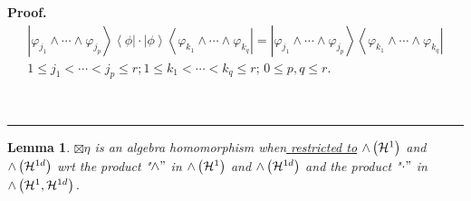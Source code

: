 \documentclass[aps,preprint]{revtex4}%
\newtheorem{lemma}[theorem]{Lemma}
\newenvironment{proof}[1][Proof]{\noindent\textbf{#1.} }{\ \rule{0.5em}{0.5em}}
\begin{document}
\begin{proof}%
\begin{gather}
\left\vert \varphi_{j_{1}}\wedge\cdots\wedge\varphi_{j_{p}}\right\rangle
\left\langle \phi\right\vert \cdot\left\vert \phi\right\rangle \left\langle
\varphi_{k_{1}}\wedge\cdots\wedge\varphi_{k_{q}}\right\vert =\left\vert
\varphi_{j_{1}}\wedge\cdots\wedge\varphi_{j_{p}}\right\rangle \left\langle
\varphi_{k_{1}}\wedge\cdots\wedge\varphi_{k_{q}}\right\vert \\
1\leq j_{1}<\cdots<j_{p}\leq r;1\leq k_{1}<\cdots<k_{q}\leq r;\,0\leq p,q\leq
r.
\end{gather}

\end{proof}

\begin{lemma}
$\boxtimes\eta$ is an algebra homomorphism \emph{when}\underline{\emph{
restricted to}} ${\huge \wedge}\left(  \mathcal{H}^{1}\right)  $ and
${\huge \wedge}\left(  \mathcal{H}^{1d}\right)  $ wrt the product "$\wedge"$
in ${\huge \wedge}\left(  \mathcal{H}^{1}\right)  $ and ${\huge \wedge}\left(
\mathcal{H}^{1d}\right)  $ and the product "$\cdot"$ in ${\huge \wedge}\left(
\mathcal{H}^{1},\mathcal{H}^{1d}\right)  .$
\end{lemma}
\end{document}
